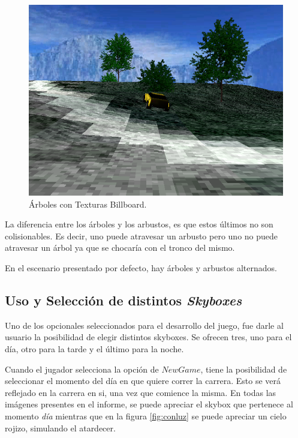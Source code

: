 \documentclass[a4paper,10pt]{article}
\begin{document}
\begin{figure}
 \centering
 \includegraphics[scale=0.4]{./billboard.png}
 \caption{\'Arboles con Texturas Billboard.}
 \label{fig:figure7}
\end{figure}

La diferencia entre los \'arboles y los arbustos, es que estos \'ultimos no son
colisionables.  Es decir, uno puede atravesar un arbusto pero uno no
puede atravesar un \'arbol ya que se chocar\'ia con el tronco del mismo.

En el escenario presentado por defecto, hay \'arboles y arbustos alternados.

\subsection{Uso y Selecci\'on de distintos \textit{Skyboxes}}

Uno de los opcionales seleccionados para el desarrollo del juego, fue darle al
usuario la posibilidad de elegir distintos skyboxes.  Se ofrecen tres, uno para
el d\'ia, otro para la tarde y el \'ultimo para la noche.

Cuando el jugador selecciona la opci\'on de $New Game$, tiene la posibilidad de
seleccionar el momento del d\'ia en que quiere correr la carrera.  Esto se
ver\'a reflejado en la carrera en si, una vez que comience la misma.  En todas
las im\'agenes presentes en el informe, se puede apreciar el skybox que
pertenece al momento \textit{d\'ia} mientras que en la figura \ref{fig:conluz}
se puede apreciar un cielo rojizo, simulando el atardecer.
\end{document}
